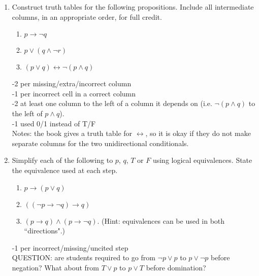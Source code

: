 \begin{enumerate}
    
    \item Construct truth tables for the following propositions. Include all intermediate columns, in an appropriate order, for full credit. 
    \begin{enumerate}
        \item $p \rightarrow \lnot q$
        \item $p \vee (q \wedge \lnot r)$
        \item $(p \vee q) \leftrightarrow \lnot (p \wedge q)$
    \end{enumerate}
    \begin{rubric}
        -2 per missing/extra/incorrect column\\
        -1 per incorrect cell in a correct column\\
        -2 at least one column to the left of a column it depends on (i.e. $\lnot (p \wedge q)$ to the left of $p \wedge q$).\\
        -1 used 0/1 instead of T/F\\    
        Notes: the book gives a truth table for $\leftrightarrow$, so it is okay if they do not make separate columns for the two unidirectional conditionals.
    \end{rubric}


    
    \item Simplify each of the following to $p$, $q$, $T$ or $F$ using logical equivalences. State the equivalence used at each step. 
    \begin{enumerate}
        \item $p \rightarrow (p \vee q)$
        \item $((\lnot p \rightarrow \lnot q) \rightarrow q)$
        \item $(p \rightarrow q) \wedge (p \rightarrow \lnot q)$. (Hint: equivalences can be used in both ``directions".)
    \end{enumerate}
    \begin{rubric}
        -1 per incorrect/missing/uncited step\\
        QUESTION: are students required to go from $\lnot p \vee p$ to $p \vee \lnot p$ before negation? What about from $T \vee p$ to $p \vee T$ before domination?
    \end{rubric}



\end{enumerate}

